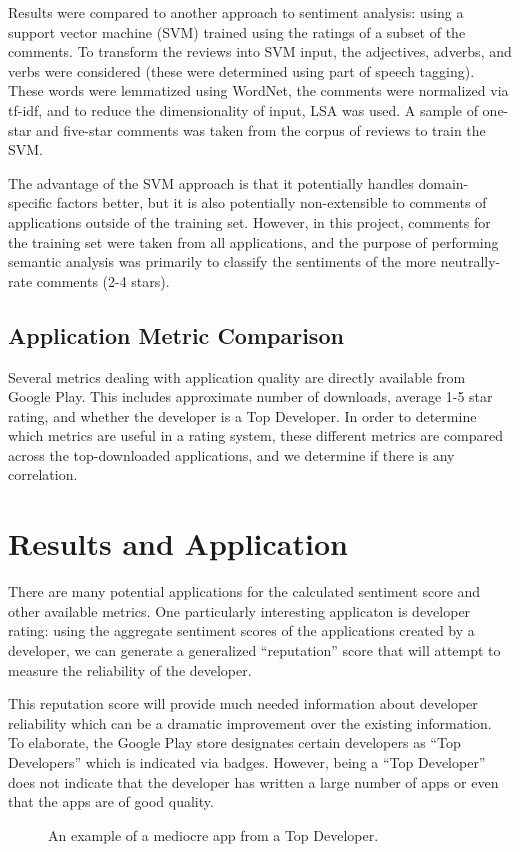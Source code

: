 \documentclass{acm_proc_article-sp}
\begin{document}
Results were compared to another approach to sentiment analysis: using a support vector machine (SVM) trained using the ratings of a subset of the comments.  To transform the reviews into SVM input, the adjectives, adverbs, and verbs were considered (these were determined using part of speech tagging).  These words were lemmatized using WordNet, the comments were normalized via tf-idf, and to reduce the dimensionality of input, LSA was used.  A sample of one-star and five-star comments was taken from the corpus of reviews to train the SVM.

The advantage of the SVM approach is that it potentially handles domain-specific factors better, but it is also potentially non-extensible to comments of applications outside of the training set.  However, in this project, comments for the training set were taken from all applications, and the purpose of performing semantic analysis was primarily to classify the sentiments of the more neutrally-rate comments (2-4 stars).

\subsection{Application Metric Comparison}
Several metrics dealing with application quality are directly available from Google Play.  This includes approximate number of downloads, average 1-5 star rating, and whether the developer is a Top Developer.  In order to determine which metrics are useful in a rating system, these different metrics are compared across the top-downloaded applications, and we determine if there is any correlation.

\section{Results and Application}
There are many potential applications for the calculated sentiment score and other available metrics. One particularly interesting applicaton is developer rating: using the aggregate sentiment scores of the applications created by a developer, we can generate a generalized ``reputation'' score that will attempt to measure the reliability of the developer.

 This reputation score will provide much needed information about developer reliability which can be a dramatic improvement over the existing information. To elaborate, the Google Play store designates certain developers as ``Top Developers'' which is indicated via badges. However, being a ``Top Developer'' does not indicate that the developer has written a large number of apps or even that the apps are of good quality.
\pagebreak
\begin{figure}[!h]
\centering
{}
\caption{An example of a mediocre app from a Top Developer.}
\label{fig:myfig}
\end{figure} 
\end{document}
